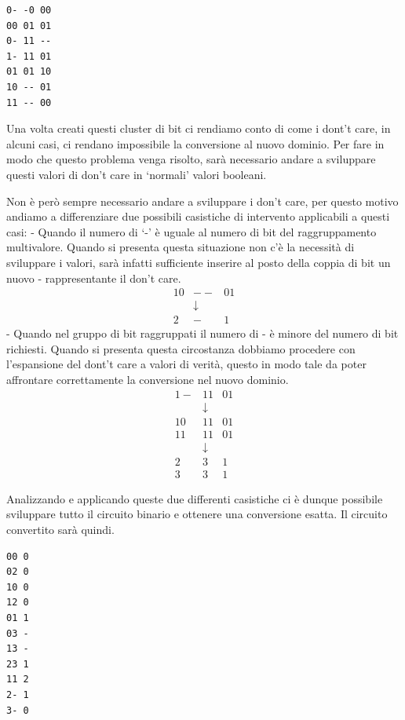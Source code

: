 \documentclass[italian,]{book}
\begin{document}
\begin{verbatim}
0- -0 00    
00 01 01
0- 11 --
1- 11 01
01 01 10
10 -- 01
11 -- 00
\end{verbatim}

Una volta creati questi cluster di bit ci rendiamo conto di come i dont't care, in alcuni casi, ci rendano impossibile la conversione al nuovo dominio. Per fare in modo che questo problema venga risolto, sarà necessario andare a sviluppare questi valori di don't care in `normali' valori booleani.

\newpage

Non è però sempre necessario andare a sviluppare i don't care, per questo motivo andiamo a differenziare due possibili casistiche di intervento applicabili a questi casi:
- Quando il numero di `-' è uguale al numero di bit del raggruppamento multivalore. Quando si presenta questa situazione non c'è la necessità di sviluppare i valori, sarà infatti sufficiente inserire al posto della coppia di bit un nuovo - rappresentante il don't care.
\[ \begin{array}{ccc}
        10 & -- & 01 \\ & \downarrow & \\ 2 & - & 1 
    \end{array}\]
- Quando nel gruppo di bit raggruppati il numero di - è minore del numero di bit richiesti. Quando si presenta questa circostanza dobbiamo procedere con l'espansione del dont't care a valori di verità, questo in modo tale da poter affrontare correttamente la conversione nel nuovo dominio.
\[ \begin{array}{cccc}
            1- & 11 & 01\\
            & \downarrow &\\
            10 & 11 & 01\\
            11 & 11 & 01\\
            & \downarrow &\\
            2 & 3 & 1\\
            3 & 3 & 1
        \end{array}\]

\newpage

Analizzando e applicando queste due differenti casistiche ci è dunque possibile sviluppare tutto il circuito binario e ottenere una conversione esatta. Il circuito convertito sarà quindi.

\begin{verbatim}
00 0
02 0
10 0
12 0
01 1
03 -
13 -
23 1
11 2
2- 1
3- 0
\end{verbatim}
\end{document}
